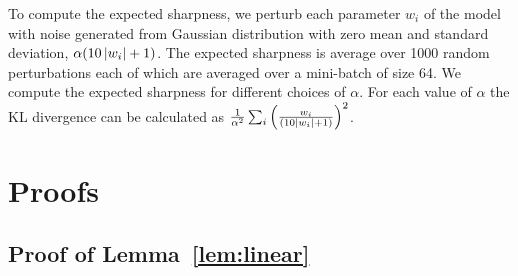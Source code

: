 \documentclass{article}
\begin{document}
To compute the expected sharpness, we perturb each parameter $w_i$ of the model with noise generated from Gaussian distribution with zero mean and standard deviation, $\alpha(10\left\lvert{w_i}\right\rvert+1)$. The expected sharpness is average over 1000 random perturbations each of which are averaged over a mini-batch of size 64. We compute the expected sharpness for different choices of $\alpha$. For each value of $\alpha$ the KL divergence can be calculated as $\frac{1}{\alpha^2}\sum_i \left(\frac{w_i}{(10\left\lvert{w_i}\right\rvert+1)}\right)^2$.

\section{Proofs}

\subsection{Proof of Lemma~\ref{lem:linear}}
\end{document}
